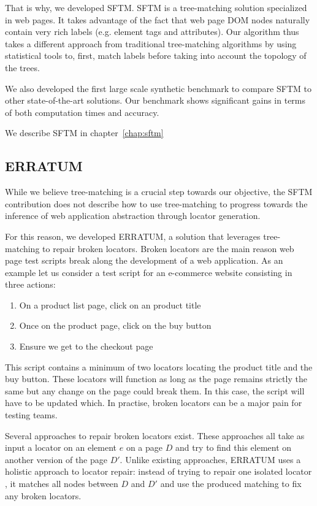 That is why, we developed SFTM. SFTM is a tree-matching solution specialized in web pages. It takes advantage of the fact that web page DOM nodes naturally contain very rich labels (e.g. element tags and attributes).
Our algorithm thus takes a different approach from traditional tree-matching algorithms by using statistical tools to, first, match labels before taking into account the topology of the trees.

We also developed the first large scale synthetic benchmark to compare SFTM to other state-of-the-art solutions. Our benchmark shows significant gains in terms of both computation times and accuracy.

We describe SFTM in chapter~\ref{chap:sftm}

\subsection{ERRATUM}
While we believe tree-matching is a crucial step towards our objective, the SFTM contribution does not describe how to use tree-matching to progress towards the inference of web application abstraction through locator generation.

For this reason, we developed ERRATUM, a solution that leverages tree-matching to repair broken locators.
Broken locators are the main reason web page test scripts break along the development of a web application. 
As an example let us consider a test script for an e-commerce website consisting in three actions:
\begin{enumerate}
    \item On a product list page, click on an product title
    \item Once on the product page, click on the buy button
    \item Ensure we get to the checkout page
\end{enumerate}
This script contains a minimum of two locators locating the product title and the buy button.
These locators will function as long as the page remains strictly the same but any change on the page could break them.
In this case, the script will have to be updated which. In practise, broken locators can be a major pain for testing teams.

Several approaches to repair broken locators exist. These approaches all take as input a locator on an element $e$ on a page $D$ and try to find this element on another version of the page $D'$.
Unlike existing approaches, ERRATUM uses a holistic approach to locator repair: instead of trying to repair one isolated locator , it matches all nodes between $D$ and $D'$ and use the produced matching to fix any broken locators.

